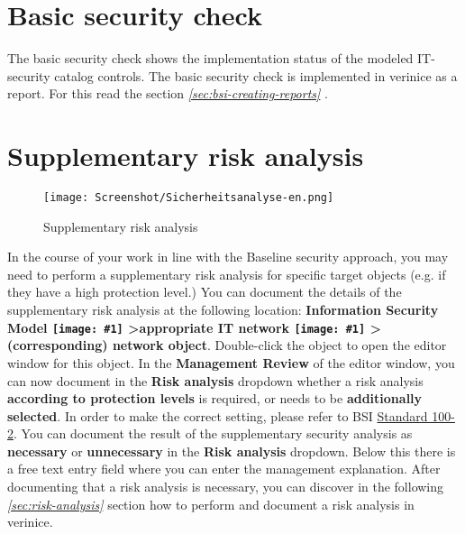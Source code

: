 \documentclass[a4paper,10pt]{book}
\newcommand{\icon}[1]{\texttt{[image: \#1]}}
\begin{document}
\section{Basic security check}
The basic security check shows the implementation status of the
modeled IT-security catalog controls.  The basic security check is
implemented in verinice as a report. For this read the section {\em
  \ref{sec:bsi-creating-reports} }.

\section{Supplementary risk analysis}\label{sec_risk_analysis}
\begin{figure}[htb!]
  \centering
  \texttt{[image: Screenshot/Sicherheitsanalyse-en.png]}
  \caption{\label{Supplementary risk analysis} Supplementary risk analysis}
\end{figure}
In the course of your work in line with the Baseline security approach, you may need to perform a
supplementary risk analysis for specific target objects (e.g. if they have a high protection level.)
You can document the details of the supplementary risk analysis at the following location:
\textbf{Information Security Model \icon{Icon/GS_Modell.png} \textgreater appropriate IT network
\icon{Icon/GS_Modell.png} \textgreater (corresponding) network object}.
Double-click the object to open the editor window for this object. In the \textbf{Management Review}
of the editor window, you can now document in the \textbf{Risk analysis} dropdown whether a risk analysis
\textbf{according to protection levels} is required, or needs to be \textbf{additionally selected}.
In order to make the correct setting, please refer to BSI
\href{https://www.bsi.bund.de/DE/Themen/ITGrundschutz/ITGrundschutzStandards/ITGrundschutzStandards_node.html#doc471418bodyText2}{Standard 100-2}.
You can document the result of the supplementary security analysis as \textbf{necessary} or \textbf{unnecessary}
in the \textbf{Risk analysis} dropdown. Below this there is a free text entry field where you can enter the
management explanation. After documenting that a risk analysis is necessary, you can discover in the
following {\em \ref{sec:risk-analysis} } section how to perform and document a risk analysis in verinice.
\end{document}
